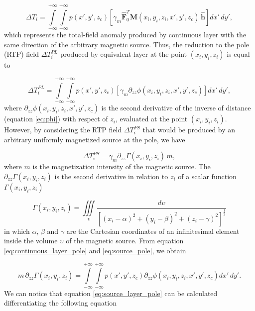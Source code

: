 \begin{equation}
\Delta T_i = \int \limits_{-\infty}^{+\infty } \int \limits_{-\infty}^{+\infty }  p(x',y',z_c)  [\gamma_m \hat{\mathbf{F}}_0^T \mathbf{M}(x_i,y_i,z_i,x',y',z_c) \,\hat{\mathbf{h}}] dx' \,dy',
\label{eq:continuous_layer_source}
\end{equation} 
which represents the total-field anomaly produced by continuous layer with the same direction of the arbitrary magnetic source. Thus, the reduction to the pole (RTP) field $\Delta T_{i}^{PL}$ produced by equivalent layer at the point $(x_i,y_i,z_i)$ is equal to 

\begin{equation}
\Delta T_{i}^{PL} = \int \limits_{-\infty}^{+\infty } \int \limits_{-\infty}^{+\infty }  p(x',y',z_c)  [\gamma_m \partial_{zz} \phi(x_i,y_i,z_i,x',y',z_c) ] dx' \,dy',
\label{eq:continuous_layer_pole}
\end{equation}
where $\partial_{zz} \phi(x_i,y_i,z_i,x',y',z_c)$ is the second derivative of the inverse of distance (equation \ref{eq:phi}) with respect of $z_i$, evaluated at the point $(x_i,y_i,z_i)$. However, by considering the RTP field $\Delta T_{i}^{PS}$ that would be produced by an arbitrary uniformly magnetized source at the pole, we have

\begin{equation}
\Delta T_{i}^{PS} = \gamma_m \partial_{zz} \Gamma(x_i,y_i,z_i) \, m,
\label{eq:source_pole}
\end{equation}
where $m$ is the magnetization intensity of the magnetic source. The $\partial_{zz} \Gamma(x_i,y_i,z_i)$ is the second derivative in relation to $z_i$ of a scalar function $\Gamma(x_i,y_i,z_i)$ 

\begin{equation}
	\Gamma(x_i,y_i,z_i) = \iiint\limits_{\upsilon} \frac{d \upsilon}{[(x_i-\alpha)^2 + (y_i-\beta)^2 + (z_i-\gamma)^2]^{\frac{1}{2}}}
	\label{eq:source_integral}
\end{equation}
in which $\alpha$, $\beta$ and $\gamma$ are the Cartesian coordinates of an infinitesimal element inside the volume $\upsilon$ of the magnetic source. From equation \ref{eq:continuous_layer_pole} and \ref{eq:source_pole}, we obtain 
 
\begin{equation}
m \, \partial_{zz} \Gamma(x_i,y_i,z_i) = \int \limits_{-\infty}^{+\infty } \int \limits_{-\infty}^{+\infty }  p(x',y',z_c)  \partial_{zz} \phi(x_i,y_i,z_i,x',y',z_c)  dx' \,dy'.
\label{eq:source_layer_pole}
\end{equation}
We can notice that equation \ref{eq:source_layer_pole} can be calculated differentiating the following equation

